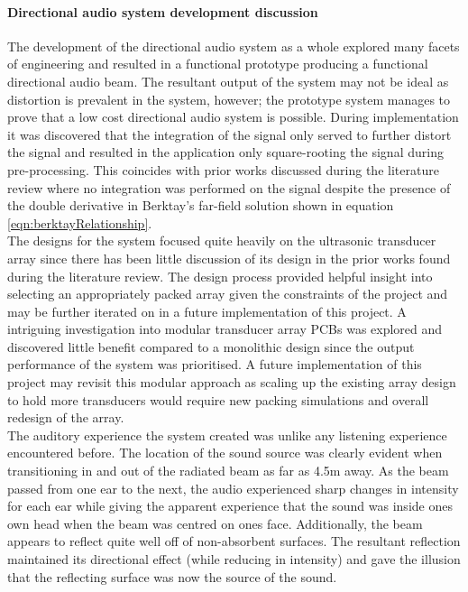 \paragraph{Directional audio system development discussion}
The development of the directional audio system as a whole explored many facets of engineering and resulted in a functional prototype producing a functional directional audio beam. The resultant output of the system may not be ideal as distortion is prevalent in the system, however; the prototype system manages to prove that a low cost directional audio system is possible. During implementation it was discovered that the integration of the signal only served to further distort the signal and resulted in the application only square-rooting the signal during pre-processing. This coincides with prior works discussed during the literature review where no integration was performed on the signal despite the presence of the double derivative in Berktay's far-field solution \cite{berktay_1965} shown in equation \ref{eqn:berktayRelationship}. \\%
The designs for the system focused quite heavily on the ultrasonic transducer array since there has been little discussion of its design in the prior works found during the literature review. The design process provided helpful insight into selecting an appropriately packed array given the constraints of the project and may be further iterated on in a future implementation of this project. A intriguing investigation into modular transducer array PCBs was explored and discovered little benefit compared to a monolithic design since the output performance of the system was prioritised. A future implementation of this project may revisit this modular approach as scaling up the existing array design to hold more transducers would require new packing simulations and overall redesign of the array.\\
The auditory experience the system created was unlike any listening experience encountered before. The location of the sound source was clearly evident when transitioning in and out of the radiated beam as far as 4.5m away. As the beam passed from one ear to the next, the audio experienced sharp changes in intensity for each ear while giving the apparent experience that the sound was inside ones own head when the beam was centred on ones face. Additionally, the beam appears to reflect quite well off of non-absorbent surfaces. The resultant reflection maintained its directional effect (while reducing in intensity) and gave the illusion that the reflecting surface was now the source of the sound.
